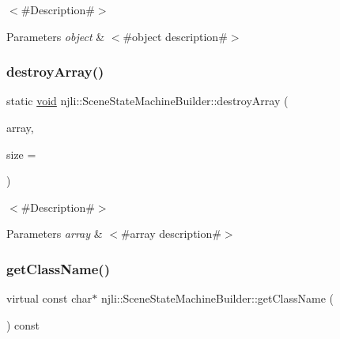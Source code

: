 $<$\#\+Description\#$>$


\begin{DoxyParams}{Parameters}
{\em object} & $<$\#object description\#$>$ \\
\hline
\end{DoxyParams}
\mbox{\label{classnjli_1_1_scene_state_machine_builder_a044c8521b552871703df61e526a43b9f}} 
\subsubsection{\texorpdfstring{destroy\+Array()}{destroyArray()}}
{\footnotesize\ttfamily static \mbox{\hyperlink{_thread_8h_af1e856da2e658414cb2456cb6f7ebc66}{void}} njli\+::\+Scene\+State\+Machine\+Builder\+::destroy\+Array (\begin{DoxyParamCaption}\item[{\mbox{\hyperlink{classnjli_1_1_scene_state_machine_builder}{Scene\+State\+Machine\+Builder}} $\ast$$\ast$}]{array,  }\item[{const \mbox{\hyperlink{_util_8h_a10e94b422ef0c20dcdec20d31a1f5049}{u32}}}]{size = {} }\end{DoxyParamCaption})\hspace{0.3cm}{\ttfamily [static]}}

$<$\#\+Description\#$>$


\begin{DoxyParams}{Parameters}
{\em array} & $<$\#array description\#$>$ \\
\hline
\end{DoxyParams}
\mbox{\label{classnjli_1_1_scene_state_machine_builder_aecc17e1921cac1cda12579de778d737a}} 
\subsubsection{\texorpdfstring{get\+Class\+Name()}{getClassName()}}
{\footnotesize\ttfamily virtual const char$\ast$ njli\+::\+Scene\+State\+Machine\+Builder\+::get\+Class\+Name (\begin{DoxyParamCaption}{ }\end{DoxyParamCaption}) const\hspace{0.3cm}{\ttfamily [virtual]}}

